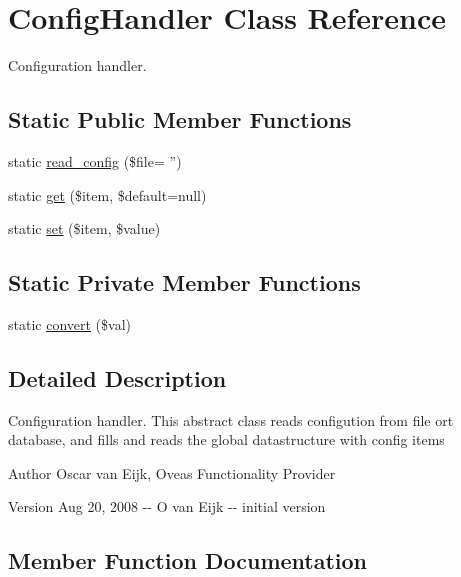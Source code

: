 \section{ConfigHandler Class Reference}
\label{classConfigHandler}


Configuration handler.  


\subsection*{Static Public Member Functions}
\begin{DoxyCompactItemize}
\item 
static \hyperlink{classConfigHandler_af61ee6f9f793e4cd0128c02e4e28bf90}{read\_\-config} (\$file= '')
\item 
static \hyperlink{classConfigHandler_aa8f6a7516588561626efccb8be5875ce}{get} (\$item, \$default=null)
\item 
static \hyperlink{classConfigHandler_a82c10cf53f06169cee0bdc0716bc089a}{set} (\$item, \$value)
\end{DoxyCompactItemize}
\subsection*{Static Private Member Functions}
\begin{DoxyCompactItemize}
\item 
static \hyperlink{classConfigHandler_a9851c66d75db6a65c64aba5192173c14}{convert} (\$val)
\end{DoxyCompactItemize}


\subsection{Detailed Description}
Configuration handler. This abstract class reads configution from file ort database, and fills and reads the global datastructure with config items \begin{DoxyAuthor}{Author}
Oscar van Eijk, Oveas Functionality Provider 
\end{DoxyAuthor}
\begin{DoxyVersion}{Version}
Aug 20, 2008 -\/-\/ O van Eijk -\/-\/ initial version 
\end{DoxyVersion}


\subsection{Member Function Documentation}
